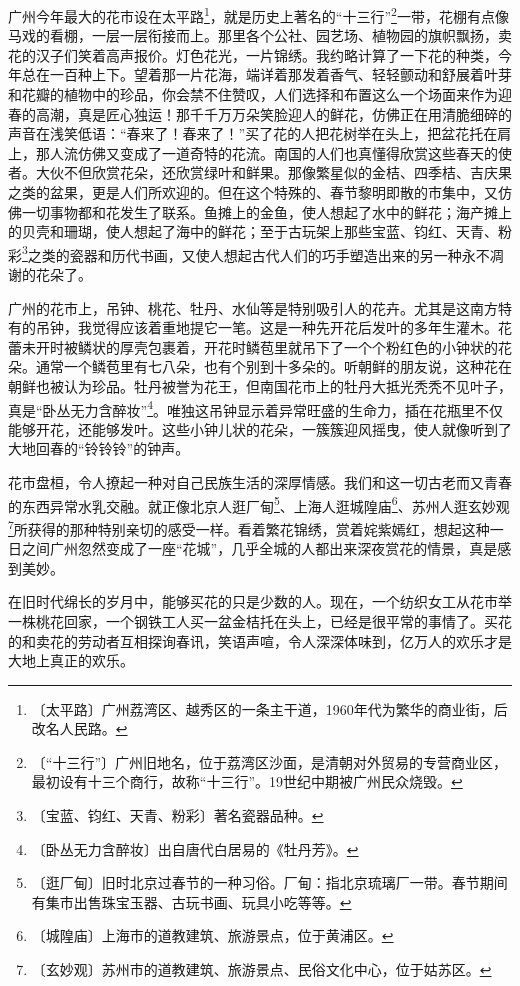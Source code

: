\documentclass[12pt,UTF-8,openany]{ctexbook}
\begin{document}
\begin{normalsize}
    广州今年最大的花市设在太平路\footnote{〔太平路〕广州荔湾区、越秀区的一条主干道，1960年代为繁华的商业街，后改名人民路。}，就是历史上著名的“十三行”\footnote{〔“十三行”〕广州旧地名，位于荔湾区沙面，是清朝对外贸易的专营商业区，最初设有十三个商行，故称“十三行”。19世纪中期被广州民众烧毁。}一带，花棚有点像马戏的看棚，一层一层衔接而上。那里各个公社、园艺场、植物园的旗帜飘扬，卖花的汉子们笑着高声报价。灯色花光，一片锦绣。我约略计算了一下花的种类，今年总在一百种上下。望着那一片花海，端详着那发着香气、轻轻颤动和舒展着叶芽和花瓣的植物中的珍品，你会禁不住赞叹，人们选择和布置这么一个场面来作为迎春的高潮，真是匠心独运！那千千万万朵笑脸迎人的鲜花，仿佛正在用清脆细碎的声音在浅笑低语：“春来了！春来了！”买了花的人把花树举在头上，把盆花托在肩上，那人流仿佛又变成了一道奇特的花流。南国的人们也真懂得欣赏这些春天的使者。大伙不但欣赏花朵，还欣赏绿叶和鲜果。那像繁星似的金桔、四季桔、吉庆果之类的盆果，更是人们所欢迎的。但在这个特殊的、春节黎明即散的市集中，又仿佛一切事物都和花发生了联系。鱼摊上的金鱼，使人想起了水中的鲜花；海产摊上的贝壳和珊瑚，使人想起了海中的鲜花；至于古玩架上那些宝蓝、钧红、天青、粉彩\footnote{〔宝蓝、钧红、天青、粉彩〕著名瓷器品种。}之类的瓷器和历代书画，又使人想起古代人们的巧手塑造出来的另一种永不凋谢的花朵了。
    
    广州的花市上，吊钟、桃花、牡丹、水仙等是特别吸引人的花卉。尤其是这南方特有的吊钟，我觉得应该着重地提它一笔。这是一种先开花后发叶的多年生灌木。花蕾未开时被鳞状的厚壳包裹着，开花时鳞苞里就吊下了一个个粉红色的小钟状的花朵。通常一个鳞苞里有七八朵，也有个别到十多朵的。听朝鲜的朋友说，这种花在朝鲜也被认为珍品。牡丹被誉为花王，但南国花市上的牡丹大抵光秃秃不见叶子，真是“卧丛无力含醉妆”\footnote{〔卧丛无力含醉妆〕出自唐代白居易的《牡丹芳》。}。唯独这吊钟显示着异常旺盛的生命力，插在花瓶里不仅能够开花，还能够发叶。这些小钟儿状的花朵，一簇簇迎风摇曳，使人就像听到了大地回春的“铃铃铃”的钟声。
    
    花市盘桓，令人撩起一种对自己民族生活的深厚情感。我们和这一切古老而又青春的东西异常水乳交融。就正像北京人逛厂甸\footnote{〔逛厂甸〕旧时北京过春节的一种习俗。厂甸：指北京琉璃厂一带。春节期间有集市出售珠宝玉器、古玩书画、玩具小吃等等。}、上海人逛城隍庙\footnote{〔城隍庙〕上海市的道教建筑、旅游景点，位于黄浦区。}、苏州人逛玄妙观\footnote{〔玄妙观〕苏州市的道教建筑、旅游景点、民俗文化中心，位于姑苏区。}所获得的那种特别亲切的感受一样。看着繁花锦绣，赏着姹紫嫣红，想起这种一日之间广州忽然变成了一座“花城”，几乎全城的人都出来深夜赏花的情景，真是感到美妙。
    
    在旧时代绵长的岁月中，能够买花的只是少数的人。现在，一个纺织女工从花市举一株桃花回家，一个钢铁工人买一盆金桔托在头上，已经是很平常的事情了。买花的和卖花的劳动者互相探询春讯，笑语声喧，令人深深体味到，亿万人的欢乐才是大地上真正的欢乐。
    

\end{normalsize}
\end{document}
